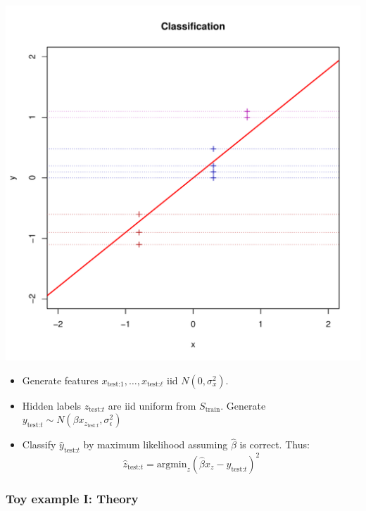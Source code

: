 \documentclass{beamer}
\begin{document}
\begin{frame}
\begin{center}
\includegraphics[scale = 0.2]{ti8.pdf}
\end{center}
\begin{itemize}
\item
Generate features $x_{\text{test:} 1}, \hdots,
x_{\text{test:} \ell}$ iid $N(0, \sigma^2_x)$.
\item
Hidden labels  $z_{\text{test:} t}$ are iid uniform from $S_{\text{train}}$.
Generate $y_{\text{test:} t} \sim N(\beta x_{z_{\text{test:} t}}, \sigma^2_\epsilon)$
\item
Classify $\hat{y}_{\text{test:} t}$ by maximum likelihood assuming
$\hat{\beta}$ is correct.  Thus:
\[
\hat{z}_{\text{test:} t} = \text{argmin}_{z} (\hat{\beta} x_z -
y_{\text{test:} t})^2
\]
\end{itemize}
\end{frame}

\begin{frame}
\frametitle{Toy example I: Theory}
\end{frame}
\end{document}
